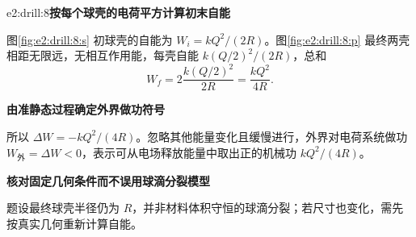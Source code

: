 \begin{drillsolution}{e2:drill:8}\textbf{按每个球壳的电荷平方计算初末自能}\par\nobreak
图\ref{fig:e2:drill:8:s} 初球壳的自能为 $W_i=kQ^2/(2R)$。图\ref{fig:e2:drill:8:p} 最终两壳相距无限远，无相互作用能，每壳自能 $k(Q/2)^2/(2R)$，总和
\[
 W_f=2\frac{k(Q/2)^2}{2R}=\frac{kQ^2}{4R}.
\]



\par\medskip{}\noindent\textbf{由准静态过程确定外界做功符号}\par\nobreak
所以 $\Delta W=-kQ^2/(4R)$。忽略其他能量变化且缓慢进行，外界对电荷系统做功 $W_{\text{外}}=\Delta W<0$，表示可从电场释放能量中取出正的机械功 $kQ^2/(4R)$。

\par\medskip{}\noindent\textbf{核对固定几何条件而不误用球滴分裂模型}\par\nobreak
题设最终球壳半径仍为 $R$，并非材料体积守恒的球滴分裂；若尺寸也变化，需先按真实几何重新计算自能。\end{drillsolution}

